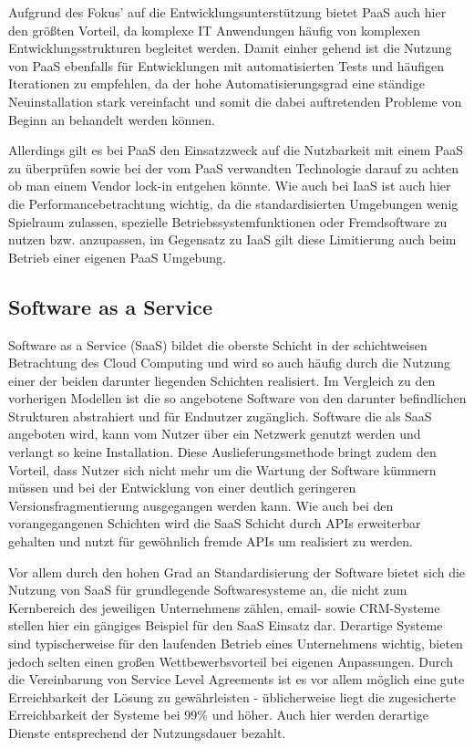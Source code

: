Aufgrund des Fokus' auf die Entwicklungsunterstützung bietet PaaS auch hier den größten Vorteil, da komplexe IT Anwendungen häufig von komplexen Entwicklungsstrukturen begleitet werden. Damit einher gehend ist die Nutzung von PaaS ebenfalls für Entwicklungen mit automatisierten Tests und häufigen Iterationen zu empfehlen, da der hohe Automatisierungsgrad eine ständige Neuinstallation stark vereinfacht und somit die dabei auftretenden Probleme von Beginn an behandelt werden können.

Allerdings gilt es bei PaaS den Einsatzzweck auf die Nutzbarkeit mit einem PaaS zu überprüfen sowie bei der vom PaaS verwandten Technologie darauf zu achten ob man einem Vendor lock-in entgehen könnte. Wie auch bei IaaS ist auch hier die Performancebetrachtung wichtig, da die standardisierten Umgebungen wenig Spielraum zulassen, spezielle Betriebssystemfunktionen oder Fremdsoftware zu nutzen bzw. anzupassen, im Gegensatz zu IaaS gilt diese Limitierung auch beim Betrieb einer eigenen PaaS Umgebung.

\subsection{Software as a Service}
Software as a Service (SaaS) bildet die oberste Schicht in der schichtweisen Betrachtung des Cloud Computing und wird so auch häufig durch die Nutzung einer der beiden darunter liegenden Schichten realisiert. Im Vergleich zu den vorherigen Modellen ist die so angebotene Software von den darunter befindlichen Strukturen abstrahiert und für Endnutzer zugänglich. Software die als SaaS angeboten wird, kann vom Nutzer über ein Netzwerk genutzt werden und verlangt so keine Installation. Diese Auslieferungsmethode bringt zudem den Vorteil, dass Nutzer sich nicht mehr um die Wartung der Software kümmern müssen und bei der Entwicklung von einer deutlich geringeren Versionsfragmentierung ausgegangen werden kann. Wie auch bei den vorangegangenen Schichten wird die SaaS Schicht durch APIs erweiterbar gehalten und nutzt für gewöhnlich fremde APIs um realisiert zu werden.

Vor allem durch den hohen Grad an Standardisierung der Software bietet sich die Nutzung von SaaS für grundlegende Softwaresysteme an, die nicht zum Kernbereich des jeweiligen Unternehmens zählen, email- sowie CRM-Systeme stellen hier ein gängiges Beispiel für den SaaS Einsatz dar. Derartige Systeme sind typischerweise für den laufenden Betrieb eines Unternehmens wichtig, bieten jedoch selten einen großen Wettbewerbsvorteil bei eigenen Anpassungen. Durch die Vereinbarung von Service Level Agreements ist es vor allem möglich eine gute Erreichbarkeit der Lösung zu gewährleisten - üblicherweise liegt die zugesicherte Erreichbarkeit der Systeme bei 99\% und höher. Auch hier werden derartige Dienste entsprechend der Nutzungsdauer bezahlt.


